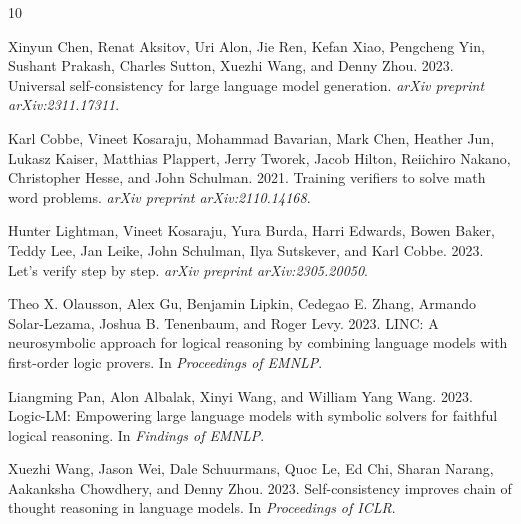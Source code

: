\documentclass[11pt,a4paper]{article}
\begin{document}
\begin{thebibliography}{10}

Xinyun Chen, Renat Aksitov, Uri Alon, Jie Ren, Kefan Xiao, Pengcheng Yin, Sushant Prakash, Charles Sutton, Xuezhi Wang, and Denny Zhou. 2023.
\newblock Universal self-consistency for large language model generation.
\newblock \textit{arXiv preprint arXiv:2311.17311}.

Karl Cobbe, Vineet Kosaraju, Mohammad Bavarian, Mark Chen, Heather Jun, Lukasz Kaiser, Matthias Plappert, Jerry Tworek, Jacob Hilton, Reiichiro Nakano, Christopher Hesse, and John Schulman. 2021.
\newblock Training verifiers to solve math word problems.
\newblock \textit{arXiv preprint arXiv:2110.14168}.

Hunter Lightman, Vineet Kosaraju, Yura Burda, Harri Edwards, Bowen Baker, Teddy Lee, Jan Leike, John Schulman, Ilya Sutskever, and Karl Cobbe. 2023.
\newblock Let's verify step by step.
\newblock \textit{arXiv preprint arXiv:2305.20050}.

Theo X. Olausson, Alex Gu, Benjamin Lipkin, Cedegao E. Zhang, Armando Solar-Lezama, Joshua B. Tenenbaum, and Roger Levy. 2023.
\newblock LINC: A neurosymbolic approach for logical reasoning by combining language models with first-order logic provers.
\newblock In \textit{Proceedings of EMNLP}.

Liangming Pan, Alon Albalak, Xinyi Wang, and William Yang Wang. 2023.
\newblock Logic-LM: Empowering large language models with symbolic solvers for faithful logical reasoning.
\newblock In \textit{Findings of EMNLP}.

Xuezhi Wang, Jason Wei, Dale Schuurmans, Quoc Le, Ed Chi, Sharan Narang, Aakanksha Chowdhery, and Denny Zhou. 2023.
\newblock Self-consistency improves chain of thought reasoning in language models.
\newblock In \textit{Proceedings of ICLR}.

\end{thebibliography}
\end{document}
